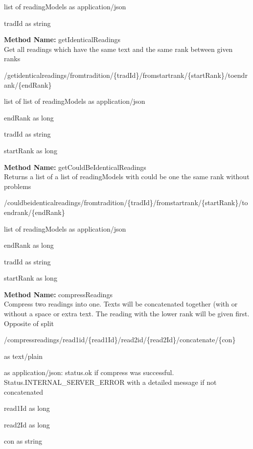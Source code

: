 \begin{response}
list of readingModels as application/json
\end{response}
\begin{parameter}
tradId as string
\end{parameter}
\textbf{Method Name: }getIdenticalReadings \\ Get all readings which have the same text and the same rank between given ranks
\begin{get}
/getidenticalreadings/fromtradition/\{tradId\}/fromstartrank/\{startRank\}/toendrank/\{endRank\}
\end{get}
\begin{response}
list of list of readingModels as application/json
\end{response}
\begin{parameter}
endRank as long
\end{parameter}
\begin{parameter}
tradId as string
\end{parameter}
\begin{parameter}
startRank as long
\end{parameter}
\textbf{Method Name: }getCouldBeIdenticalReadings \\ Returns a list of a list of readingModels with could be one the same rank without problems
\begin{get}
/couldbeidenticalreadings/fromtradition/\{tradId\}/fromstartrank/\{startRank\}/toendrank/\{endRank\}
\end{get}
\begin{response}
list of readingModels as application/json
\end{response}
\begin{parameter}
endRank as long
\end{parameter}
\begin{parameter}
tradId as string
\end{parameter}
\begin{parameter}
startRank as long
\end{parameter}
\textbf{Method Name: }compressReadings \\ Compress two readings into one. Texts will be concatenated together (with or without a space or extra text. The reading with the lower rank will be given first. Opposite of split
\begin{post}
/compressreadings/read1id/\{read1Id\}/read2id/\{read2Id\}/concatenate/\{con\}
\end{post}
\begin{request}
 as text/plain
\end{request}
\begin{response}
 as application/json: status.ok if compress was successful. Status.INTERNAL\_SERVER\_ERROR with a detailed message if not concatenated
\end{response}
\begin{parameter}
read1Id as long
\end{parameter}
\begin{parameter}
read2Id as long
\end{parameter}
\begin{parameter}
con as string
\end{parameter}
